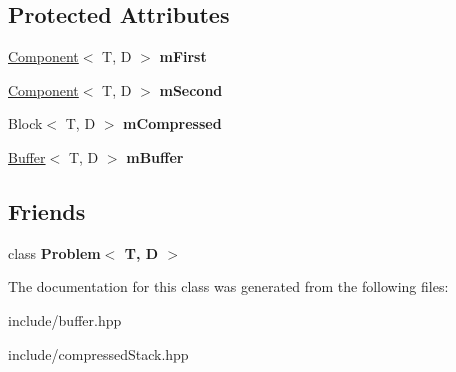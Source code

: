 \subsection*{Protected Attributes}
\begin{DoxyCompactItemize}
\item 
\hyperlink{class_component}{Component}$<$ T, D $>$ {\bfseries m\+First}\hypertarget{class_compressed_stack_a01b36c057eea8081a803aa4aa2eaf9f2}{}\label{class_compressed_stack_a01b36c057eea8081a803aa4aa2eaf9f2}

\item 
\hyperlink{class_component}{Component}$<$ T, D $>$ {\bfseries m\+Second}\hypertarget{class_compressed_stack_ae7318db14913195490d6dde2323ad1bf}{}\label{class_compressed_stack_ae7318db14913195490d6dde2323ad1bf}

\item 
Block$<$ T, D $>$ {\bfseries m\+Compressed}\hypertarget{class_compressed_stack_a67f78c7cdcac6d2e9339c9c4b5f3b60c}{}\label{class_compressed_stack_a67f78c7cdcac6d2e9339c9c4b5f3b60c}

\item 
\hyperlink{class_buffer}{Buffer}$<$ T, D $>$ {\bfseries m\+Buffer}\hypertarget{class_compressed_stack_a6ea67dc13c6b584d2257f18eefcc158f}{}\label{class_compressed_stack_a6ea67dc13c6b584d2257f18eefcc158f}

\end{DoxyCompactItemize}
\subsection*{Friends}
\begin{DoxyCompactItemize}
\item 
class {\bfseries Problem$<$ T, D $>$}\hypertarget{class_compressed_stack_a49d2c5c1103bce3a8ba02241be7f15c0}{}\label{class_compressed_stack_a49d2c5c1103bce3a8ba02241be7f15c0}

\end{DoxyCompactItemize}


The documentation for this class was generated from the following files\+:\begin{DoxyCompactItemize}
\item 
include/buffer.\+hpp\item 
include/compressed\+Stack.\+hpp\end{DoxyCompactItemize}
